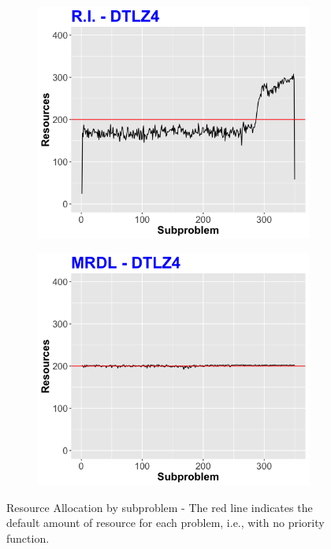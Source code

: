 \begin{figure}[!t]
\begin{subfigure}[b]{0.33\textwidth}
		\centering
		\includegraphics[width=1\textwidth, height=0.8\textwidth]{images/Ra-gra-dtlz4.png}
	\end{subfigure}
	\begin{subfigure}[b]{0.33\textwidth}
		\centering
		\includegraphics[width=1\textwidth, height=0.8\textwidth]{images/Ra-mrdl-dtlz4.png}
	\end{subfigure}
	\caption{Resource Allocation by subproblem - The red line indicates the default amount of resource for each problem, i.e., with no priority function.}
	\label{RAs}

\end{figure}



